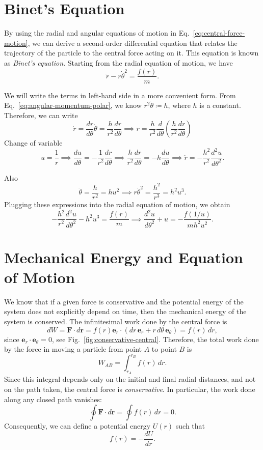 \documentclass[12pt]{article}
\begin{document}
\section{Binet's Equation}

By using the radial and angular equations of motion in Eq.~\ref{eq:central-force-motion}, we can derive a second-order differential equation that relates the trajectory of the particle to the central force acting on it. This equation is known as \emph{Binet's equation}. Starting from the radial equation of motion, we have
\[
\ddot{r} - r\dot{\theta}^2 = \frac{f(r)}{m}.
\]

We will write the terms in left-hand side in a more convenient form. From Eq.~\ref{eq:angular-momentum-polar},  we know $r^2\dot{\theta} \coloneqq h$, where $h$ is a constant. Therefore, we can write 
\[
\dot{r} = \frac{dr}{d\theta}\dot{\theta} = \frac{h}{r^2}\frac{dr}{d\theta} \implies \ddot{r}  = \frac{h}{r^2}\frac{d}{d\theta}\left(\frac{h}{r^2}\frac{dr}{d\theta}\right) 
\]
Change of variable 
\[
u = \frac{1}{r} \implies \frac{du}{d\theta}= -\frac{1}{r^2}\frac{dr}{d\theta} \implies \frac{h}{r^2}\frac{dr}{d\theta} = -h\frac{du}{d\theta} \implies \ddot{r} = -\frac{h^2}{r^2}\frac{d^2u}{d\theta^2}.
\]

Also
\[
\dot{\theta} = \frac{h}{r^2} = hu^2 \implies r\dot{\theta}^2 = \frac{h^2}{r^3} = h^2u^3.
\]
Plugging these expressions into the radial equation of motion, we obtain
\[
-\frac{h^2}{r^2}\frac{d^2u}{d\theta^2} - h^2u^3 = \frac{f(r)}{m} \implies \frac{d^2u}{d\theta^2} + u = -\frac{f(1/u)}{mh^2u^2}.
\]

\section{Mechanical Energy and Equation of Motion}

We know that if a given force is conservative and the potential energy of the system does not explicitly depend on time, then the mechanical energy of the system is conserved. The infinitesimal work done by the central force is
\[
    dW = \mathbf{F}\cdot d\mathbf{r} = f(r)\mathbf{e}_r\cdot
    \left(dr\,\mathbf{e}_r
    +r\,d\theta\,\mathbf{e}_\theta\right)
    = f(r)\,dr,
\]
since $\mathbf{e}_r\cdot\mathbf{e}_\theta=0$, see Fig.~\ref{fig:conservative-central}. Therefore, the total work done by the force in moving a particle
from point $A$ to point $B$ is
\[
    W_{AB}=\int_{r_A}^{r_B}f(r)\,dr.
\]
Since this integral depends only on the initial and final radial distances, and not on the path taken, the central force is \emph{conservative}. In particular, the work done along any closed path vanishes:
\[
    \oint\mathbf{F}\cdot d\mathbf{r}
    =\oint f(r)\,dr=0.
\]
Consequently, we can define a potential energy $U(r)$ such that
\[
    f(r)=-\frac{dU}{dr}.
\]
\end{document}
